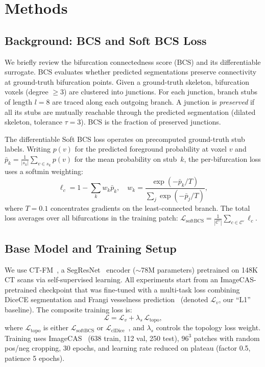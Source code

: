 \documentclass[runningheads]{llncs}
\begin{document}
\section{Methods}

\subsection{Background: BCS and Soft BCS Loss}
\label{sec:bcs}

We briefly review the bifurcation connectedness score (BCS) and its differentiable surrogate.
BCS evaluates whether predicted segmentations preserve connectivity at ground-truth bifurcation points.
Given a ground-truth skeleton, bifurcation voxels (degree ${\geq}3$) are clustered into junctions.
For each junction, branch stubs of length $l{=}8$ are traced along each outgoing branch.
A junction is \emph{preserved} if all its stubs are mutually reachable through the predicted segmentation (dilated skeleton, tolerance $\tau{=}3$).
BCS is the fraction of preserved junctions.

The differentiable Soft BCS loss operates on precomputed ground-truth stub labels.
Writing $p(v)$ for the predicted foreground probability at voxel $v$ and $\bar{p}_k = \frac{1}{|s_k|}\sum_{v \in s_k} p(v)$ for the mean probability on stub~$k$, the per-bifurcation loss uses a softmin weighting:
\begin{equation}\label{eq:softbcs}
\ell_c = 1 - \sum_k w_k \bar{p}_k, \quad
w_k = \frac{\exp(-\bar{p}_k/T)}{\sum_j \exp(-\bar{p}_j/T)},
\end{equation}
where $T{=}0.1$ concentrates gradients on the least-connected branch.
The total loss averages over all bifurcations in the training patch:
$\mathcal{L}_{\mathrm{softBCS}} = \frac{1}{|\mathcal{C}'|}\sum_{c \in \mathcal{C}'} \ell_c$.

\subsection{Base Model and Training Setup}

We use CT-FM~\cite{pai_ctfm_2025}, a SegResNet~\cite{myronenko_segresnet_2019} encoder (${\sim}$78M parameters) pretrained on 148K CT scans via self-supervised learning.
All experiments start from an ImageCAS-pretrained checkpoint that was fine-tuned with a multi-task loss combining DiceCE segmentation and Frangi vesselness prediction~\cite{frangi_multiscale_1998} (denoted $\mathcal{L}_v$, our ``L1'' baseline).
The composite training loss is:
\begin{equation}\label{eq:loss}
\mathcal{L} = \mathcal{L}_v + \lambda_s \, \mathcal{L}_{\mathrm{topo}},
\end{equation}
where $\mathcal{L}_{\mathrm{topo}}$ is either $\mathcal{L}_{\mathrm{softBCS}}$ or $\mathcal{L}_{\mathrm{clDice}}$~\cite{shit_cldice_2021}, and $\lambda_s$ controls the topology loss weight.
Training uses ImageCAS~\cite{zeng_imagecas_2023} (638 train, 112 val, 250 test), $96^3$ patches with random pos/neg cropping, 30 epochs, and learning rate reduced on plateau (factor 0.5, patience 5 epochs).
\end{document}
